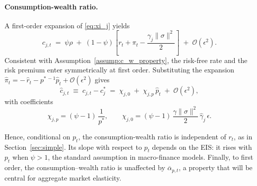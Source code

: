 \paragraph{Consumption-wealth ratio.}  
A first-order expansion of \eqref{eq:xi_j} yields
\begin{equation}
    c_{j,t}
    \;=\;
    \psi\rho \;+\; (1-\psi)\!\left[r_t + \pi_t - \frac{\gamma_j\|\sigma\|^2}{2}\right]
    \;+\; \mathcal{O}(\epsilon^2).
\end{equation}
Consistent with Assumption~\ref{assump:c_w_property}, the risk-free rate and the risk premium enter symmetrically at first order. Substituting the expansion
\(\hat{\pi}_t = -\,\hat{r}_t - p^{*\,-1}\hat{p}_t + \mathcal{O}(\epsilon^2)\) gives
\begin{equation}
    \hat c_{j,t} \;\equiv\; c_{j,t} - c_j^*
    \;=\; \chi_{j,0} \;+\; \chi_{j,p}\,\hat{p}_t \;+\; \mathcal{O}(\epsilon^2),
\end{equation}
with coefficients
\[
    \chi_{j,p}=(\psi-1)\,\frac{1}{p^*},
    \qquad 
    \chi_{j,0}=(\psi-1)\,\frac{\gamma\|\sigma\|^2}{2}\,\hat{\gamma}_j\,\epsilon.
\]

Hence, conditional on $p_t$, the consumption-wealth ratio is independent of $r_t$, as in Section~\ref{sec:simple}. Its slope with respect to $p_t$ depends on the EIS: it rises with $p_t$ when $\psi>1$, the standard assumption in macro-finance models. Finally, to first order, the consumption–wealth ratio is unaffected by $\overline{\alpha}_{p,t}$, a property that will be central for aggregate market elasticity.



